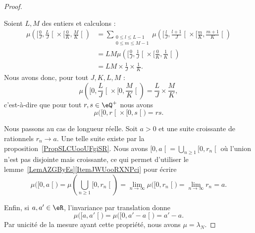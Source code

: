 \begin{proof}
\begin{subproof}
        Soient \( L,M\) des entiers et calculons :
        \begin{subequations}
            \begin{align}
                \mu\left( \mathopen[ \frac{ 0 }{ J } , \frac{ L }{ J } \mathclose[\times \mathopen[ \frac{ 0 }{ K } , \frac{ M }{ K } \mathclose[ \right)&=\sum_{\substack{0\leq l\leq L-1\\0\leq m\leq M-1}}\mu\left(   \mathopen[    \frac{ l }{ J },\frac{ l+1 }{ J }  \mathclose[\times \mathopen[ \frac{ m }{ K } , \frac{ m+1 }{ K } \mathclose[      \right)\\
                    &=LM\mu\left(  \mathopen[ \frac{ 0 }{ J } , \frac{ 1 }{ J } \mathclose[\times \mathopen[ \frac{ 0 }{ K } , \frac{ 1 }{ K } \mathclose[  \right)\\
                        &=LM\times \frac{1}{ J }\times \frac{1}{ K }.
            \end{align}
        \end{subequations}
        Nous avons donc, pour tout \( J,K,L,M\) :
        \begin{equation}
            \mu\left( \mathopen[ 0 , \frac{ L }{ J } \mathclose[\times \mathopen[ 0, \frac{ M }{ K } \mathclose[ \right)=\frac{ L }{ J }\times \frac{ M }{ K },
        \end{equation}
        c'est-à-dire que pour tout \( r,s\in \eQ^+\) nous avons
        \begin{equation}
            \mu\big(   \mathopen[ 0 , r \mathclose[\times \mathopen[ 0 , s \mathclose[ \big)=rs.
        \end{equation}
    \item[Longueur réelle]
        Nous passons au cas de longueur réelle. Soit \( a>0\) et une suite croissante de rationnels \( r_n\to a\). Une telle suite existe par la proposition~\ref{PropSLCUooUFgiSR}. Nous avons \( \mathopen[ 0 , a \mathclose[=\bigcup_{n\geq 1}\mathopen[ 0 , r_n \mathclose[\) où l'union n'est pas disjointe mais croissante, ce qui permet d'utiliser le lemme~\ref{LemAZGByEs}\ref{ItemJWUooRXNPci} pour écrire
        \begin{equation}
            \mu\big( \mathopen[ 0 , a \mathclose[ \big)=\mu\left( \bigcup_{n\geq 1}\mathopen[ 0 , r_n \mathclose[ \right)=\lim_{n\to \infty} \mu\big( \mathopen[ 0 , r_n \mathclose[ \big)=\lim_{n\to \infty} r_n=a.
        \end{equation}
    \end{subproof}

    Enfin, si \( a,a'\in \eR\), l'invariance par translation donne
    \begin{equation}
        \mu\big( \mathopen[ a , a' \mathclose[ \big)=\mu\big( \mathopen[ 0 , a'-a \mathclose[ \big)=a'-a.
    \end{equation}
    Par unicité de la mesure ayant cette propriété, nous avons \( \mu=\lambda_N\).
\end{proof}

